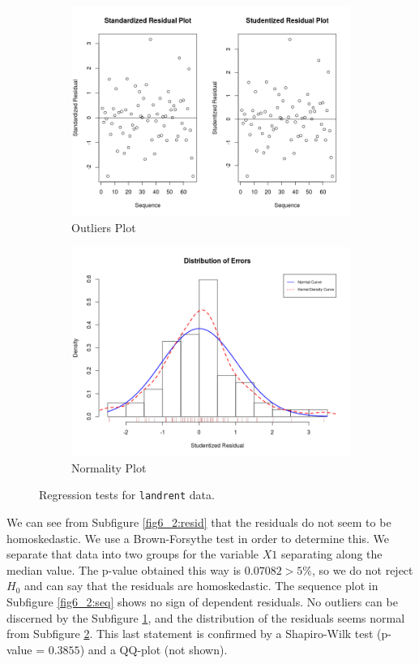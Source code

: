 \documentclass[]{article}
\begin{document}
\begin{figure}[!ht]
\begin{subfigure}{.5\textwidth}
  \includegraphics[width=\linewidth]{outliers6.png}
  \caption{Outliers Plot}
  \label{fig6_2:outliers}
\end{subfigure}%
\begin{subfigure}{.5\textwidth}
  \centering
  \includegraphics[width=\linewidth]{normality6.png}
  \caption{Normality Plot}
  \label{fig6_2:normal}
\end{subfigure}
\caption{Regression tests for \texttt{landrent} data.}
\label{fig6_2}
\end{figure}

We can see from Subfigure \ref{fig6_2:resid} that the residuals do not seem to be homoskedastic. We use a Brown-Forsythe test in order to determine this. We separate that data into two groups for the variable $X1$ separating along the median value. The p-value obtained this way is $0.07082 > 5\%$, so we do not reject $H_0$ and can say that the residuals are homoskedastic. The sequence plot in Subfigure \ref{fig6_2:seq} shows no sign of dependent residuals. No outliers can be discerned by the Subfigure \ref{fig6_2:outliers}, and the distribution of the residuals seems normal from Subfigure \ref{fig6_2:normal}. This last statement is confirmed by a Shapiro-Wilk test (p-value = $0.3855$) and a QQ-plot (not shown).
\end{document}
